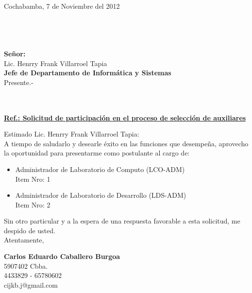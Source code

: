 \documentclass[letterpaper,11pt]{letter}
\begin{document}
Cochabamba, 7 de Noviembre del 2012\\
~\\
~\\
~\\
~\\
 \textbf{Señor:}~\\
Lic. Henrry Frank Villarroel Tapia~\\
 \textbf{Jefe de Departamento de Informática y Sistemas}~\\
Presente.-\\
~\\
~\\
\begin{center}
\underline{ \textbf{Ref.: Solicitud de participación en el proceso de selección de auxiliares}}
\end{center}
Estimado Lic. Henrry Frank Villarroel Tapia:\\
A tiempo de saludarlo y desearle éxito en las funciones que desempeña, aprovecho la oportunidad para presentarme como postulante al cargo de:\\
\begin{itemize}
\item Administrador de Laboratorio de Computo (LCO-ADM)~\\
Item Nro: 1
\item Administrador de Laboratorio de Desarrollo (LDS-ADM)~\\
Item Nro: 2
\end{itemize}

Sin otro particular y a la espera de una respuesta favorable a esta solicitud, me despido de usted.\\
Atentamente,\\

\vspace{3.5cm}
\begin{center}
\begin{minipage}[b]{0.5\textwidth}
\begin{center}
{\bf Carlos Eduardo Caballero Burgoa}\\
5907402 Cbba.\\
4433829 - 65780602\\
cijkb.j@gmail.com\\
\end{center}
\end{minipage}
\end{center}
\newpage
\end{document}
